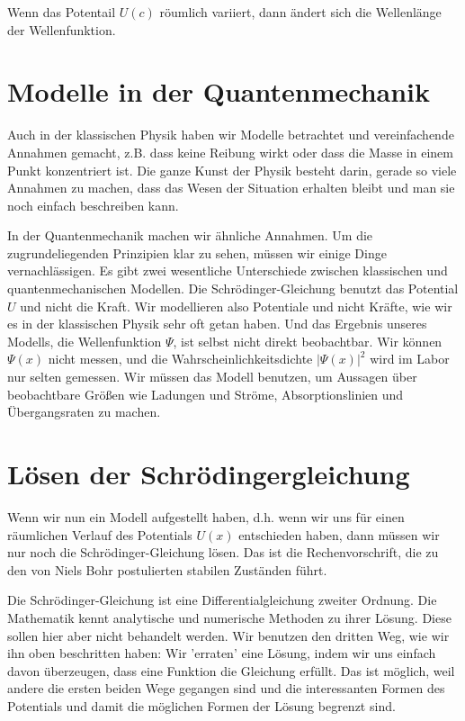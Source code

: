 \begin{marginfigure}
    \caption{Wenn das Potentail $U(c)$ röumlich variiert, dann ändert sich die Wellenlänge der Wellenfunktion.}
    \label{fig:4_potential_slope_WF}
\end{marginfigure}




\section{Modelle in der Quantenmechanik}

Auch in der klassischen Physik haben wir Modelle betrachtet und vereinfachende Annahmen gemacht, z.B. dass keine Reibung wirkt oder dass die Masse in einem Punkt konzentriert ist. Die ganze Kunst der Physik besteht darin, gerade so viele Annahmen zu machen, dass das Wesen der Situation erhalten bleibt und man sie noch einfach beschreiben kann.

In der Quantenmechanik machen wir ähnliche Annahmen. Um die zugrundeliegenden Prinzipien klar zu sehen, müssen wir einige Dinge vernachlässigen. Es gibt zwei wesentliche Unterschiede zwischen klassischen und quantenmechanischen Modellen. Die Schrödinger-Gleichung benutzt das Potential $U$ und nicht die Kraft. Wir modellieren also Potentiale und nicht Kräfte, wie wir es in der klassischen Physik sehr oft getan haben. Und das Ergebnis unseres Modells, die Wellenfunktion $\Psi$, ist selbst nicht direkt beobachtbar. Wir können $\Psi(x)$ nicht messen, und die Wahrscheinlichkeitsdichte $|\Psi(x)|^2$ wird im Labor nur selten gemessen. Wir müssen das Modell benutzen, um Aussagen über beobachtbare Größen wie Ladungen und Ströme, Absorptionslinien und Übergangsraten zu machen.


\section{Lösen der Schrödingergleichung}

Wenn wir nun ein Modell aufgestellt haben, d.h. wenn wir uns für einen räumlichen Verlauf des Potentials $U(x)$ entschieden haben, dann müssen wir nur noch die Schrödinger-Gleichung lösen. Das ist die Rechenvorschrift, die zu den von Niels Bohr postulierten stabilen Zuständen führt.

Die Schrödinger-Gleichung ist eine Differentialgleichung zweiter Ordnung. Die Mathematik kennt analytische und numerische Methoden zu ihrer Lösung. Diese sollen hier aber nicht behandelt werden. Wir benutzen den dritten Weg, wie wir ihn oben beschritten haben: Wir 'erraten' eine Lösung, indem wir uns einfach davon überzeugen, dass eine Funktion die Gleichung erfüllt. Das ist möglich, weil andere die ersten beiden Wege gegangen sind und die interessanten Formen des Potentials und damit die möglichen Formen der Lösung begrenzt sind.

